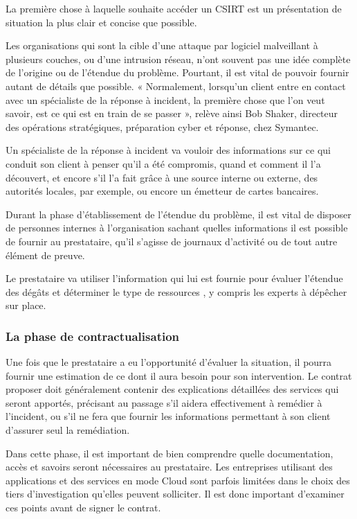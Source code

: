 La première chose à laquelle souhaite accéder un CSIRT est un présentation de situation la plus clair et concise  que possible.

 Les organisations qui sont la cible d’une attaque par logiciel malveillant à plusieurs couches, ou d’une intrusion réseau, n’ont souvent pas une idée complète de l’origine ou de l’étendue du problème. Pourtant, il est vital de pouvoir fournir autant de détails que possible. « Normalement, lorsqu’un client entre en contact avec un spécialiste de la réponse à incident, la première chose que l’on veut savoir, est ce qui est en train de se passer », relève ainsi Bob Shaker, directeur des opérations stratégiques, préparation cyber et réponse, chez Symantec.

Un spécialiste de la réponse à incident va vouloir des informations sur ce qui conduit son client à penser qu’il a été compromis, quand et comment il l’a découvert, et encore s’il l’a fait grâce à une source interne ou externe, des autorités locales, par exemple, ou encore un émetteur de cartes bancaires.

Durant la phase d’établissement de l’étendue du problème, il est vital de disposer de personnes internes à l’organisation sachant quelles informations il est possible de fournir au prestataire, qu’il s’agisse de journaux d’activité ou de tout autre élément de preuve.

Le prestataire va utiliser l’information qui lui est fournie pour évaluer l’étendue des dégâts et déterminer le type de ressources , y compris les experts à dépêcher sur place.

\subsubsection{La phase de contractualisation}

Une fois que le prestataire a eu l’opportunité d’évaluer la situation, il pourra fournir une estimation de ce dont il aura besoin pour son intervention. Le contrat proposer doit généralement contenir des explications détaillées des services qui seront apportés, précisant au passage s’il aidera effectivement à remédier à l’incident, ou s’il ne fera que fournir les informations permettant à son client d’assurer seul la remédiation.

Dans cette phase, il est important de bien comprendre quelle documentation, accès et savoirs seront nécessaires au prestataire.  Les entreprises utilisant des applications et des services en mode Cloud sont parfois limitées dans le choix des tiers d’investigation qu’elles peuvent solliciter. Il est donc important d’examiner ces points avant de signer le contrat.

